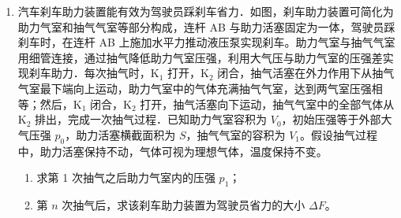 \documentclass[\gkver]{gaokaozhenti}
\begin{document}
\begin{enumerate}
{联立解得

 $x_{2} = \frac{m}{M + m} a$

（2）小球向左运动过程中凹槽向右运动，当小球的坐标为  $(x,y)$ 时，此时凹槽水平向右运动的位移为  $\Delta x$，根据上式有

$m(a-x)=M\cdot\Delta x$

则小球现在在凹槽所在的椭圆上，根据数学知识可知此时的椭圆方程为

 $\frac{(x-\Delta x)^2}{a^2}+\frac{y^2}{b^2}=1$

整理得  $[x(M+m)-ma]^2 + \frac{y^2}{b^2} = 1$

 $M^2a^2$

（3）将  $\frac{M}{m} = \frac{b}{a - b}$ 代入小球的轨迹方程化简可得

 $\left[x - (a - b)\right]^2 + y^2 = b^2$

即此时小球的轨迹为以  $(a - b)$ 为圆心， $b$ 为半径的圆，则当小球下降的高度为  $\frac{b}{2}$ 时有如图

此时可知速度和水平方向的夹角为  $60^\circ$，小球下降  $\frac{b}{2}$ 的过程中，系统水平方向动量守恒

 $0 = mv_3 \cos 60^\circ - Mv_4$

系统机械能守恒

 $mg\frac{b}{2} = \frac{1}{2}mv_3^2 + \frac{1}{2}Mv_4^2$

联立得  $v_3 = \sqrt{\frac{4gb^2}{a + 3b}} = 2b\sqrt{\frac{g}{a + 3b}}$
}

\item
汽车刹车助力装置能有效为驾驶员踩刹车省力．如图，刹车助力装置可简化为助力气室和抽气气室等部分构成，连杆 AB 与助力活塞固定为一体，驾驶员踩刹车时，在连杆 AB 上施加水平力推动液压泵实现刹车。助力气室与抽气气室用细管连接，通过抽气降低助力气室压强，利用大气压与助力气室的压强差实现刹车助力．每次抽气时，K$_{1}$ 打开，K$_{2}$ 闭合，抽气活塞在外力作用下从抽气气室最下端向上运动，助力气室中的气体充满抽气气室，达到两气室压强相等；然后，K$_{1}$ 闭合，K$_{2}$ 打开，抽气活塞向下运动，抽气气室中的全部气体从 K$_{2}$ 排出，完成一次抽气过程．已知助力气室容积为 $V_{0}$，初始压强等于外部大气压强 $p_{0}$，助力活塞横截面积为 $S$，抽气气室的容积为 $V_{1}$。假设抽气过程中，助力活塞保持不动，气体可视为理想气体，温度保持不变。
\begin{enumerate}
	\item
	求第 1 次抽气之后助力气室内的压强 $p_{1}$；
	\item
	第 $n$ 次抽气后，求该刹车助力装置为驾驶员省力的大小 $\Delta F$。
\end{enumerate}
\end{enumerate}
\end{document}
